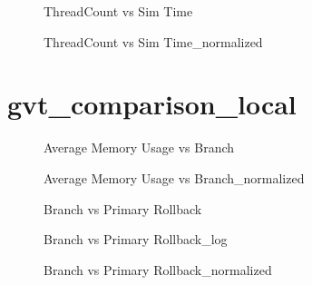 \vspace{1cm}
\begin{figure}[H]
\centering

\caption{ThreadCount vs Sim Time}
\end{figure}
\vspace{1cm}
\newpage
\begin{figure}[H]
\centering

\caption{ThreadCount vs Sim Time\_normalized}
\end{figure}
\vspace{1cm}
\newpage

\section{gvt\_comparison\_local}
\begin{figure}[H]
\centering

\caption{Average Memory Usage vs Branch}
\end{figure}
\vspace{1cm}
\begin{figure}[H]
\centering

\caption{Average Memory Usage vs Branch\_normalized}
\end{figure}
\vspace{1cm}
\newpage
\begin{figure}[H]
\centering

\caption{Branch vs Primary Rollback}
\end{figure}
\vspace{1cm}
\begin{figure}[H]
\centering

\caption{Branch vs Primary Rollback\_log}
\end{figure}
\vspace{1cm}
\newpage
\begin{figure}[H]
\centering

\caption{Branch vs Primary Rollback\_normalized}
\end{figure}
